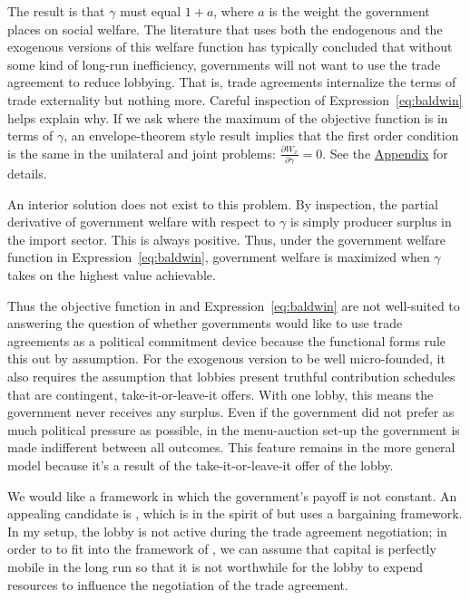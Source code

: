 \documentclass[12pt]{article}
\newcommand{\ga}{\gamma}
\begin{document}
The \Textcite{gh94} result is that $\ga$ must equal $1+a$, where $a$ is the weight the government places on social welfare. The literature that uses both the endogenous and the exogenous versions of this welfare function has typically concluded that without some kind of long-run inefficiency, governments will not want to use the trade agreement to reduce lobbying. That is, trade agreements internalize the terms of trade externality but nothing more. Careful inspection of Expression~\ref{eq:baldwin} helps explain why. If we ask where the maximum of the objective function is in terms of $\ga$, an envelope-theorem style result implies that the first order condition is the same in the unilateral and joint problems: $\displaystyle \frac{\partial W_x}{\partial \ga} = 0$. See the \hyperlink{envelope}{Appendix} for details.

An interior solution does not exist to this problem. By inspection, the partial derivative of government welfare with respect to $\ga$ is simply producer surplus in the import sector. This is always positive. Thus, under the government welfare function in Expression~\ref{eq:baldwin}, government welfare is maximized when $\ga$ takes on the highest value achievable.

Thus the objective function in \Textcite{gh94} and Expression~\ref{eq:baldwin} are not well-suited to answering the question of whether governments would like to use trade agreements as a political commitment device because the functional forms rule this out by assumption. For the exogenous version to be well micro-founded, it also requires the assumption that lobbies present truthful contribution schedules that are contingent, take-it-or-leave-it offers. With one lobby, this means the government never receives any surplus. Even if the government did not prefer as much political pressure as possible, in the menu-auction set-up the government is made indifferent between all outcomes. This feature remains in the more general \Textcite{dgh97} model because it's a result of the take-it-or-leave-it offer of the lobby.

We would like a framework in which the government's payoff is not constant. An appealing candidate is \Textcite{mrc2007}, which is in the spirit of \Textcite{gh94} but uses a bargaining framework. In my setup, the lobby is not active during the trade agreement negotiation; in order to to fit into the framework of \Textcite{mrc2007}, we can assume that capital is perfectly mobile in the long run so that it is not worthwhile for the lobby to expend resources to influence the negotiation of the trade agreement.
\end{document}

